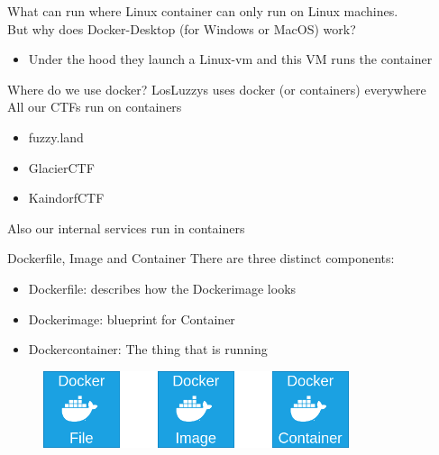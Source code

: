 \documentclass[12pt]{beamer}
\begin{document}
\begin{frame}{What can run where}
    Linux container can only run on Linux machines. \\
    But why does Docker-Desktop (for Windows or MacOS) work? \\
    \begin{itemize}
        \item Under the hood they launch a Linux-vm and this VM runs the container \cite{Ferquel_2019}
    \end{itemize}
\end{frame}

\begin{frame}{Where do we use docker?}
    LosLuzzys uses docker (or containers) everywhere \\
    All our CTFs run on containers
    \begin{itemize}[label=\textcolor{black}{\textbullet}]
        \item fuzzy.land
        \item GlacierCTF
        \item KaindorfCTF
    \end{itemize}
    Also our internal services run in containers
\end{frame}


\begin{frame}{Dockerfile, Image and Container}
    There are three distinct components:
    \begin{itemize}
        \item Dockerfile: describes how the Dockerimage looks
        \item Dockerimage: blueprint for Container
        \item Dockercontainer: The thing that is running
    \end{itemize}

    \begin{figure}
        \centering
        \includegraphics[width=0.8\textwidth]{images/docker_file_image_container.png}
    \end{figure}
\end{frame}
\end{document}

